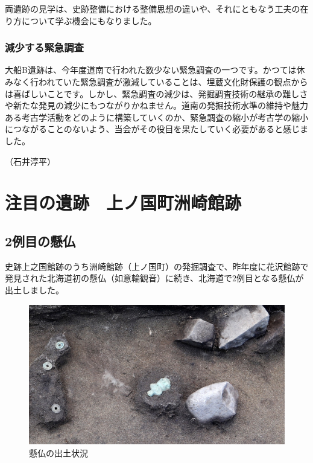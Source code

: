 \documentclass[a4j,11pt,twocolumn,openany]{jsbook}
\begin{document}
両遺跡の見学は、史跡整備における整備思想の違いや、それにともなう工夫の在り方について学ぶ機会にもなりました。

\subsection{減少する緊急調査}
大船B遺跡は、今年度道南で行われた数少ない緊急調査の一つです。かつては休みなく行われていた緊急調査が激減していることは、埋蔵文化財保護の観点からは喜ばしいことです。しかし、緊急調査の減少は、発掘調査技術の継承の難しさや新たな発見の減少にもつながりかねません。道南の発掘技術水準の維持や魅力ある考古学活動をどのように構築していくのか、緊急調査の縮小が考古学の縮小につながることのないよう、当会がその役目を果たしていく必要があると感じました。

\begin{flushright}
	（石井淳平）
\end{flushright}


\chapter{注目の遺跡　上ノ国町洲崎館跡　}

\section{2例目の懸仏}

史跡上之国館跡のうち洲崎館跡（上ノ国町）の発掘調査で、昨年度に花沢館跡で発見された北海道初の懸仏（如意輪観音）に続き、北海道で2例目となる懸仏が出土しました。

\begin{figure}[ht]
	\centering
	\includegraphics[width=\linewidth]{fig/08_Tukada/02shutudo.JPG}
	\caption{懸仏の出土状況}
	\label{}
	\vspace{-\baselineskip}
\end{figure}
\end{document}
